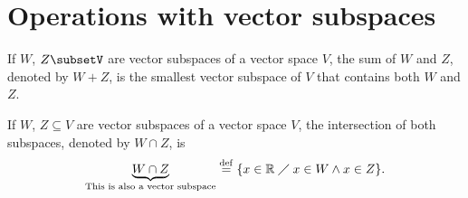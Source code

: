 

\section{Operations with vector subspaces}
\begin{prop}
    If $W$, $Z\subsetV$ are vector subspaces of a vector space $V$, the sum of $W$ and $Z$, denoted by
    $W + Z$, is the smallest vector subspace of $V$ that contains both $W$ and $Z$.
\end{prop}

\begin{prop}
    If $W$, $Z\subseteq V$ are vector subspaces of a vector space $V$, the intersection of both subspaces,
    denoted by $W\cap Z$, is
    \begin{equation}
        \underbrace{W\cap Z}_{\textrm{This is also a vector subspace}} \overset{\mathrm{def}}{=} \{x\in \mathbb{R}\;\diagup\; x\in W\land x\in
        Z\}.
    \end{equation}
\end{prop}

